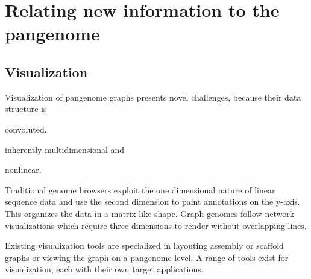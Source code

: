 \section{Relating new information to the pangenome}

\subsection{Visualization}

\cite{nielsen2009abyss}
\cite{yokoyama_momi-g:_2019}
\cite{nazarie_visualization_nodate_2019}


Visualization of pangenome graphs presents novel challenges, because their data structure is \begin{enumerate*}[label=(\alph*)]
\item convoluted,
\item inherently multidimensional and
\item nonlinear.
\end{enumerate*} Traditional genome browsers exploit the one dimensional nature of linear sequence data and use the second dimension to paint annotations on the y-axis. This organizes the data in a matrix-like shape. Graph genomes follow network visualizations which require three dimensions to render without overlapping lines.  

Existing visualization tools are specialized in layouting assembly or scaffold graphs or viewing the graph on a pangenome level. 
A range of tools exist for visualization, each with their own target applications.

